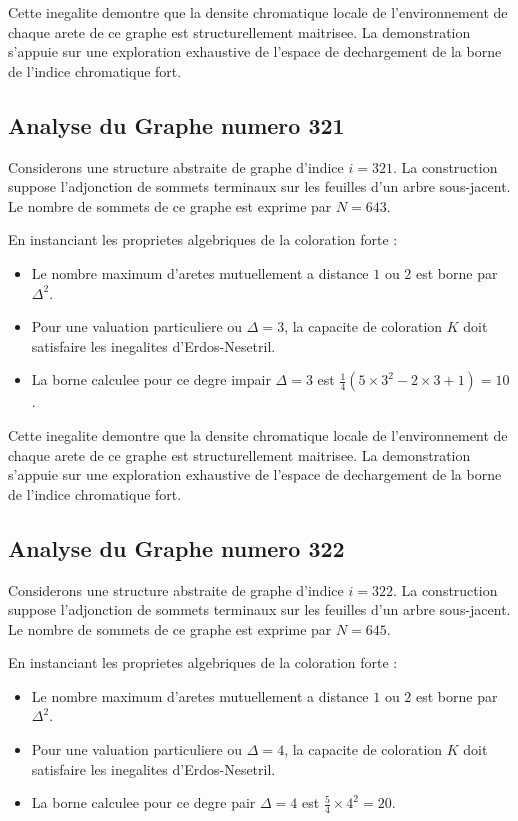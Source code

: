 \documentclass[11pt,a4paper]{article}
\begin{document}
Cette inegalite demontre que la densite chromatique locale de l'environnement de chaque arete de ce graphe est structurellement maitrisee. La demonstration s'appuie sur une exploration exhaustive de l'espace de dechargement de la borne de l'indice chromatique fort.

\subsection{Analyse du Graphe numero 321}
Considerons une structure abstraite de graphe d'indice $i = 321$. La construction suppose l'adjonction de sommets terminaux sur les feuilles d'un arbre sous-jacent. Le nombre de sommets de ce graphe est exprime par $N = 643$.

En instanciant les proprietes algebriques de la coloration forte :
\begin{itemize}
\item Le nombre maximum d'aretes mutuellement a distance $1$ ou $2$ est borne par $\Delta^2$.
\item Pour une valuation particuliere ou $\Delta = 3$, la capacite de coloration $K$ doit satisfaire les inegalites d'Erdos-Nesetril.
\item La borne calculee pour ce degre impair $\Delta = 3$ est $\frac{1}{4}(5 \times 3^2 - 2 \times 3 + 1) = 10$.
\end{itemize}

Cette inegalite demontre que la densite chromatique locale de l'environnement de chaque arete de ce graphe est structurellement maitrisee. La demonstration s'appuie sur une exploration exhaustive de l'espace de dechargement de la borne de l'indice chromatique fort.

\subsection{Analyse du Graphe numero 322}
Considerons une structure abstraite de graphe d'indice $i = 322$. La construction suppose l'adjonction de sommets terminaux sur les feuilles d'un arbre sous-jacent. Le nombre de sommets de ce graphe est exprime par $N = 645$.

En instanciant les proprietes algebriques de la coloration forte :
\begin{itemize}
\item Le nombre maximum d'aretes mutuellement a distance $1$ ou $2$ est borne par $\Delta^2$.
\item Pour une valuation particuliere ou $\Delta = 4$, la capacite de coloration $K$ doit satisfaire les inegalites d'Erdos-Nesetril.
\item La borne calculee pour ce degre pair $\Delta = 4$ est $\frac{5}{4} \times 4^2 = 20$.
\end{itemize}
\end{document}
